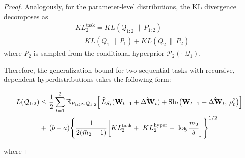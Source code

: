 \documentclass[letterpaper]{article} %
\begin{document}
\begin{proof}
Analogously, for the parameter-level distributions, the KL divergence decomposes as
\begin{align*}
 &KL^{\text{task}}_2 =KL(Q_{1:2}\,\|\,P_{1:2})  \\
 &   = KL(Q_1\,\|\,P_1) + KL(Q_2\,\|\,P_2)
\end{align*}
where $P_2$ is sampled from the conditional hyperprior $\mathcal{P}_2(\cdot|\mathcal{Q}_1)$.



Therefore, the generalization bound for two sequential tasks with recursive, dependent hyperdistributions takes the following form:




\begin{align}
 L(\mathcal{Q}_{1:2}) &\leq \frac{1}{2} \sum_{t=1}^2 
    \mathbb{E}_{P_{1:2} \sim \mathcal{Q}_{1:2}} 
    \Big[\, 
        \widehat{L}_{S_t}(\mathbf{W}_{t-1} + \hat{\Delta\mathbf{W}}_t) 
    + \mathrm{Sh}_t\big(\mathbf{W}_{t-1} + \hat{\Delta\mathbf{W}}_t,\, \rho_t^2\big)
    \Big] \notag \\
&+\, (b-a)\Bigg\{ \frac{1}{2(\bar{m}_2 - 1)} \bigg[
            KL^{\text{task}}_2 
            +\; KL^{\text{hyper}}_2 
            +\; \log\frac{\bar{m}_2}{\delta}
        \bigg] \Bigg\}^{1/2}
\end{align}


where 



\end{proof}
\end{document}
